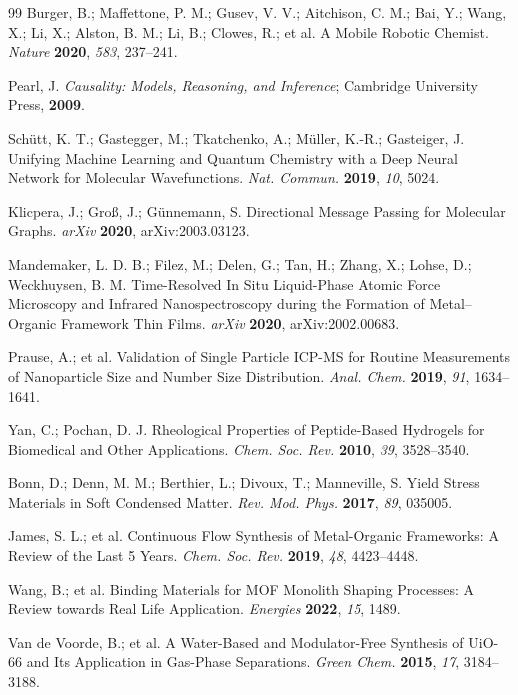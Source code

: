 \documentclass[12pt,a4paper]{article}
\begin{document}
\begin{thebibliography}{99}
 Burger, B.; Maffettone, P. M.; Gusev, V. V.; Aitchison, C. M.; Bai, Y.; Wang, X.; Li, X.; Alston, B. M.; Li, B.; Clowes, R.; et al. A Mobile Robotic Chemist. \textit{Nature} \textbf{2020}, \textit{583}, 237–241.

 Pearl, J. \textit{Causality: Models, Reasoning, and Inference}; Cambridge University Press, \textbf{2009}.

 Schütt, K. T.; Gastegger, M.; Tkatchenko, A.; Müller, K.-R.; Gasteiger, J. Unifying Machine Learning and Quantum Chemistry with a Deep Neural Network for Molecular Wavefunctions. \textit{Nat. Commun.} \textbf{2019}, \textit{10}, 5024.

 Klicpera, J.; Groß, J.; Günnemann, S. Directional Message Passing for Molecular Graphs. \textit{arXiv} \textbf{2020}, arXiv:2003.03123.

 Mandemaker, L. D. B.; Filez, M.; Delen, G.; Tan, H.; Zhang, X.; Lohse, D.; Weckhuysen, B. M. Time-Resolved In Situ Liquid-Phase Atomic Force Microscopy and Infrared Nanospectroscopy during the Formation of Metal--Organic Framework Thin Films. \textit{arXiv} \textbf{2020}, arXiv:2002.00683.

 Prause, A.; et al. Validation of Single Particle ICP-MS for Routine Measurements of Nanoparticle Size and Number Size Distribution. \textit{Anal. Chem.} \textbf{2019}, \textit{91}, 1634–1641.

 Yan, C.; Pochan, D. J. Rheological Properties of Peptide-Based Hydrogels for Biomedical and Other Applications. \textit{Chem. Soc. Rev.} \textbf{2010}, \textit{39}, 3528--3540.

 Bonn, D.; Denn, M. M.; Berthier, L.; Divoux, T.; Manneville, S. Yield Stress Materials in Soft Condensed Matter. \textit{Rev. Mod. Phys.} \textbf{2017}, \textit{89}, 035005.

 James, S. L.; et al. Continuous Flow Synthesis of Metal-Organic Frameworks: A Review of the Last 5 Years. \textit{Chem. Soc. Rev.} \textbf{2019}, \textit{48}, 4423–4448.

 Wang, B.; et al. Binding Materials for MOF Monolith Shaping Processes: A Review towards Real Life Application. \textit{Energies} \textbf{2022}, \textit{15}, 1489.

 Van de Voorde, B.; et al. A Water-Based and Modulator-Free Synthesis of UiO-66 and Its Application in Gas-Phase Separations. \textit{Green Chem.} \textbf{2015}, \textit{17}, 3184–3188.


\end{thebibliography}
\end{document}
